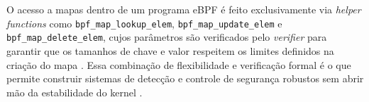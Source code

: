 O acesso a mapas dentro de um programa eBPF é feito exclusivamente via
\textit{helper functions} como \texttt{bpf\_map\_lookup\_elem},
\texttt{bpf\_map\_update\_elem} e \texttt{bpf\_map\_delete\_elem}, cujos
parâmetros são verificados pelo \textit{verifier} para garantir que os tamanhos
de chave e valor respeitem os limites definidos na criação do mapa
\cite{linuxkernel2024}.
Essa combinação de flexibilidade e verificação formal é o que permite construir
sistemas de detecção e controle de segurança robustos sem abrir mão da
estabilidade do kernel \cite{gregg2019}.